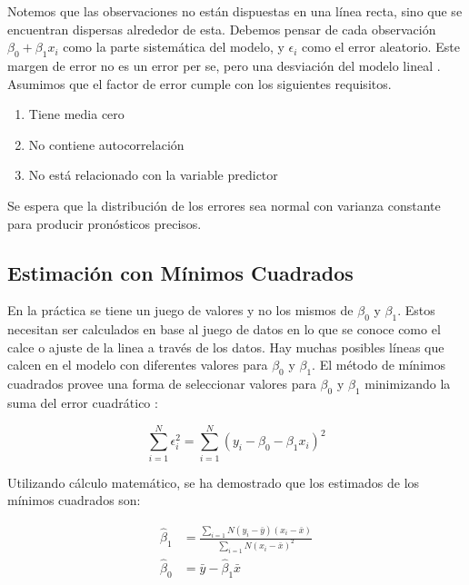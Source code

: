 Notemos que las observaciones no están dispuestas en una línea recta, sino que se encuentran dispersas alrededor de esta. Debemos pensar de cada observación $\beta_{0} + \beta_{1}x_{i}$ como la parte sistemática del modelo, y $\epsilon_i$ como el error aleatorio. Este margen de error no es un error per se, pero una desviación del modelo lineal \cite{hyndman}. Asumimos que el factor de error cumple con los siguientes requisitos. 

\begin{enumerate}
  \item Tiene media cero
  \item No contiene autocorrelación
  \item No está relacionado con la variable predictor
\end{enumerate}

Se espera que la distribución de los errores sea normal con varianza constante para producir pronósticos precisos. 

\subsection{Estimación con Mínimos Cuadrados}
En la práctica se tiene un juego de valores y no los mismos de $\beta_{0}$ y $\beta_{1}$. Estos necesitan ser calculados en base al juego de datos en lo que se conoce como el calce o ajuste de la linea a través de los datos. Hay muchas posibles líneas que calcen en el modelo con diferentes valores para $\beta_{0}$ y $\beta_{1}$. El método de mínimos cuadrados provee una forma de seleccionar valores para $\beta_{0}$ y $\beta_{1}$ minimizando la suma del error cuadrático \cite{estadisticaBasica}:

\begin{equation}
	\sum_{i=1}^{N} \epsilon_{i}^{2} = \sum_{i=1}^{N}(y_{i} - \beta_{0} - \beta_{1}x_{i})^2
\end{equation}

Utilizando cálculo matemático, se ha demostrado que los estimados de los mínimos cuadrados son:

\begin{equation}
\begin{split}
	\hat{\beta}_{1} &= \frac{\sum_{i=1}{N}(y_{i}-\bar{y})(x_{i} - \bar{x})}{\sum_{i=1}{N}(x_{i}-\bar{x})^2}\\
	\hat{\beta}_{0} &= \bar{y} - \hat{\beta}_{1} \bar{x}\\
\end{split}
\end{equation}

